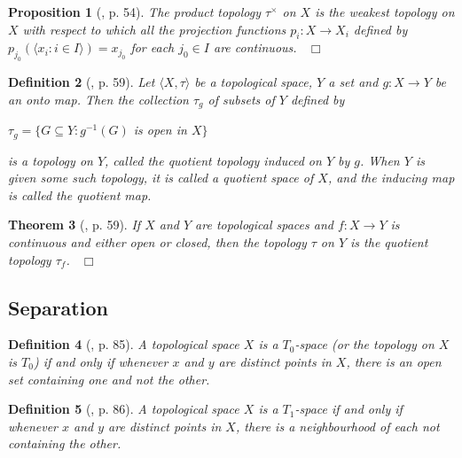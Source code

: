 \documentclass[12pt, oneside]{book}
\newtheorem{theorem}{Theorem}[subsection]
\newtheorem{proposition}[theorem]{Proposition}
\newtheorem{definition}[theorem]{Definition}
\newcommand{\qed}{\hfill ~$\Box$\\}
\begin{document}
\begin{proposition}[\cite{W2}, p. 54] 
\normalfont
The product topology $\tau^{\times}$ on $X$ is the weakest topology on $X$ with respect to 
which all the projection functions $p_i : X \rightarrow  X_i$ defined by 
$p_{j_0}(\langle x_i : i \in I \rangle) =x_{j_0}$ for each $j_0 \in I$ are continuous. \qed
\end{proposition}

\begin{definition}[\cite{W2}, p. 59] 
\normalfont
Let $\langle X, \tau \rangle$ be a topological space, $Y$ a set and $g : X \rightarrow Y$ be 
an onto map.
Then the collection $\tau_g$ of subsets of $Y$ defined by
\begin{center}
$\tau_g = \{G \subseteq Y : g^{-1}(G)$ is open in $ X \}$
\end{center}
is a topology on $Y$, called the {\sl quotient topology} induced on $Y$ by $g$. When $Y$ is given 
some such topology, it is called a {\sl quotient space} of $X$, and the inducing map is called 
the {\sl quotient map}. 
\end{definition}

\begin{theorem}[\cite{W2}, p. 59] \label{QuotientTopology}
\normalfont
If $X$ and $Y$ are topological spaces and $f:X \rightarrow Y$ is continuous and either open 
or closed, then the topology $\tau$ on $Y$ is the quotient topology $\tau_f$.
\qed
\end{theorem}


\subsection{Separation}

\begin{definition}[\cite{W2}, p. 85] \label{defnT0}
\normalfont
\noindent A topological space $X$ is a $T_0$-{\sl space} (or the topology on $X$ is $T_0$) if and only if whenever $x$ and $y$ are distinct points in $X$, there is an open set containing one and not the other.

\end{definition}

\begin{definition}[\cite{W2}, p. 86] \label{defnT1}
\normalfont
\noindent A topological space $X$ is a $T_1$-{\sl space} if and only if whenever $x$ and $y$ are distinct points in $X$, there is a neighbourhood of each not containing the other.
\end{definition}
\end{document}
